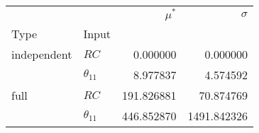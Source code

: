 \begin{tabular}{llrr}
\toprule
     &               &  $\mu^\ast$ &     $\sigma$ \\
Type & Input &             &              \\
\midrule
independent & $RC$ &    0.000000 &     0.000000 \\
     & $\theta_{11}$ &    8.977837 &     4.574592 \\
full & $RC$ &  191.826881 &    70.874769 \\
     & $\theta_{11}$ &  446.852870 &  1491.842326 \\
\bottomrule
\end{tabular}
